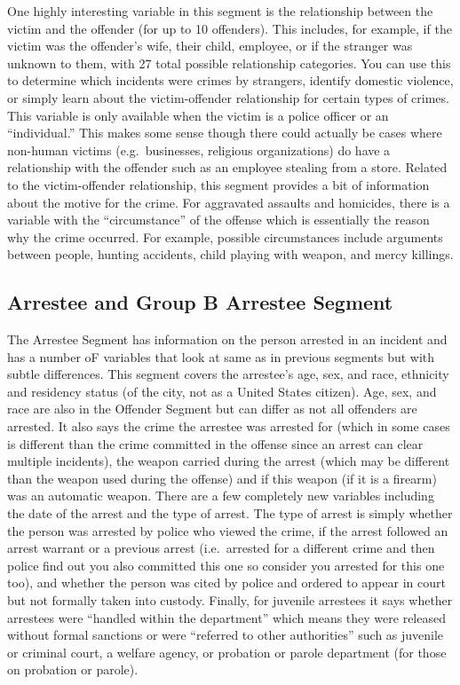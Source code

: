 \documentclass[
  12pt,
  openany]{book}
\begin{document}
One highly interesting variable in this segment is the relationship between the victim and the offender (for up to 10 offenders). This includes, for example, if the victim was the offender's wife, their child, employee, or if the stranger was unknown to them, with 27 total possible relationship categories. You can use this to determine which incidents were crimes by strangers, identify domestic violence, or simply learn about the victim-offender relationship for certain types of crimes. This variable is only available when the victim is a police officer or an ``individual.'' This makes some sense though there could actually be cases where non-human victims (e.g.~businesses, religious organizations) do have a relationship with the offender such as an employee stealing from a store. Related to the victim-offender relationship, this segment provides a bit of information about the motive for the crime. For aggravated assaults and homicides, there is a variable with the ``circumstance'' of the offense which is essentially the reason why the crime occurred. For example, possible circumstances include arguments between people, hunting accidents, child playing with weapon, and mercy killings.

\hypertarget{arrestee-and-group-b-arrestee-segment}{%
\subsection{Arrestee and Group B Arrestee Segment}\label{arrestee-and-group-b-arrestee-segment}}

The Arrestee Segment has information on the person arrested in an incident and has a number oF variables that look at same as in previous segments but with subtle differences. This segment covers the arrestee's age, sex, and race, ethnicity and residency status (of the city, not as a United States citizen). Age, sex, and race are also in the Offender Segment but can differ as not all offenders are arrested. It also says the crime the arrestee was arrested for (which in some cases is different than the crime committed in the offense since an arrest can clear multiple incidents), the weapon carried during the arrest (which may be different than the weapon used during the offense) and if this weapon (if it is a firearm) was an automatic weapon. There are a few completely new variables including the date of the arrest and the type of arrest. The type of arrest is simply whether the person was arrested by police who viewed the crime, if the arrest followed an arrest warrant or a previous arrest (i.e.~arrested for a different crime and then police find out you also committed this one so consider you arrested for this one too), and whether the person was cited by police and ordered to appear in court but not formally taken into custody. Finally, for juvenile arrestees it says whether arrestees were ``handled within the department'' which means they were released without formal sanctions or were ``referred to other authorities'' such as juvenile or criminal court, a welfare agency, or probation or parole department (for those on probation or parole).
\end{document}
